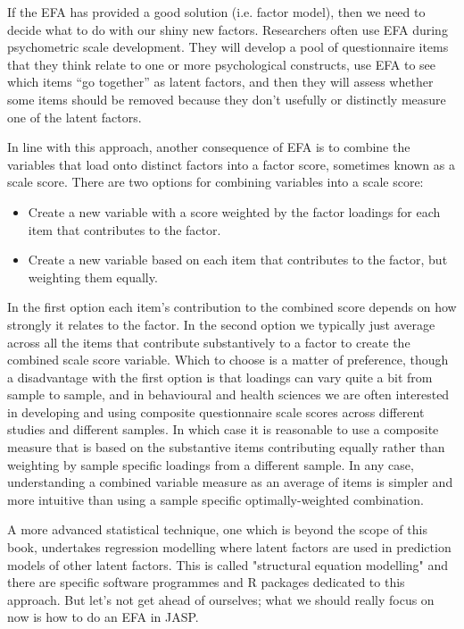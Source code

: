 
If the EFA has provided a good solution (i.e. factor model), then we need to decide what to do with our shiny new factors. Researchers often use EFA during psychometric scale development. They will develop a pool of questionnaire items that they think relate to one or more psychological constructs, use EFA to see which items “go together” as latent factors, and then they will assess whether some items should be removed because they don't usefully or distinctly measure one of the latent factors. 

In line with this approach, another consequence of EFA is to combine the variables that load onto distinct factors into a factor score, sometimes known as a scale score. There are two options for combining variables into a scale score:

\begin{itemize} \itemsep -2pt
\item Create a new variable with a score weighted by the factor loadings for each item that contributes to the factor. 
\item Create a new variable based on each item that contributes to the factor, but weighting them equally. 
\end{itemize}

In the first option each item’s contribution to the combined score depends on how strongly it relates to the factor. In the second option we typically just average across all the items that contribute substantively to a factor to create the combined scale score variable. Which to choose is a matter of preference, though a disadvantage with the first option is that loadings can vary quite a bit from sample to sample, and in behavioural and health sciences we are often interested in developing and using composite questionnaire scale scores across different studies and different samples. In which case it is reasonable to use a composite measure that is based on the substantive items contributing equally rather than weighting by sample specific loadings from a different sample. In any case, understanding a combined variable measure as an average of items is simpler and more intuitive than using a sample specific optimally-weighted combination.

A more advanced statistical technique, one which is beyond the scope of this book, undertakes regression modelling where latent factors are used in prediction models of other latent factors. This is called "structural equation modelling" and there are specific software programmes and R packages dedicated to this approach. But let's not get ahead of ourselves; what we should really focus on now is how to do an EFA in JASP.  

